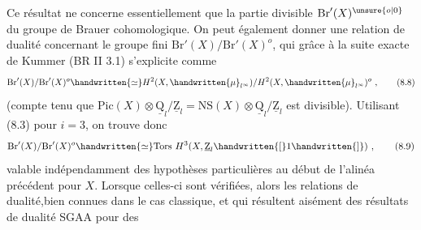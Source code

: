  Ce résultat ne concerne essentiellement que la partie divisible $\mathrm{Br}'(X)^{\unsure{o|0}}$ du groupe de Brauer cohomologique. On peut également donner une relation de dualité concernant le  groupe fini $\mathrm{Br}'(X)/\mathrm{Br}'(X)^o$, qui grâce à la suite exacte de Kummer (BR II 3.1) s'explicite comme
\[
\mathrm{Br}'(X)/\mathrm{Br}'(X)^o\handwritten{\simeq}H^2(X,\handwritten{\mu}_{l^\infty})/H^2(X,\handwritten{\mu}_{l^\infty})^o\ , \tag*{(8.8)}
\]
(compte tenu que $\mathrm{Pic}(X)\otimes\underline{\mathrm Q}_l/\underline{\mathrm Z}_l=\mathrm{NS}(X)\otimes\underline{\mathrm Q}_l/\underline{\mathrm Z}_l$ est divisible). Utilisant (8.3) pour $i=3$, on trouve donc
\[
\mathrm{Br}'(X)/\mathrm{Br}'(X)^o\handwritten{\simeq}\mathrm{Tors}\ H^3(X,\underline{\mathrm Z}_l\handwritten{[}1\handwritten{]})\ , \tag*{(8.9)}
\]
\handwritten{(}valable indépendamment des hypothèses particulières  au début de l'alinéa précédent pour $X$. Lorsque celles-ci sont vérifiées, alors les relations de dualité,bien connues dans le cas classique, et qui résultent aisément  des résultats de dualité \margin{\handwritten{$\times$}}\handwritten{[}SGAA \handwritten{$\underline{\overline{\mathrm{XIX}}}$\quad]} pour des

